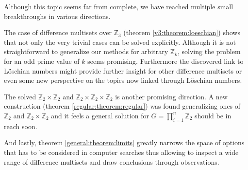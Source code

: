 Although this topic seems far from complete, we have reached multiple small breakthroughs in various directions.

The case of difference multisets over $\mathbb Z_3$ (theorem \ref{v3:theorem:loeschian}) shows that not only the very trivial cases can be solved explicitly. Although it is not straightforward to generalize our methods for arbitrary $\mathbb Z_k$, solving the problem for an odd prime value of $k$ seems promising. Furthermore the discovered link to Löschian numbers might provide further insight for other difference multisets or even some new perspective on the topics now linked through Löschian numbers.

The solved $\mathbb Z_2 \times \mathbb Z_2$ and $\mathbb Z_2 \times \mathbb Z_2 \times \mathbb Z_2$ is another promising direction. A new construction (theorem \ref{regular:theorem:regular}) was found generalizing ones of $\mathbb Z_2$ and $\mathbb Z_2 \times \mathbb Z_2$ and it feels a general solution for $G=\prod_{i=1}^{n} \mathbb Z_2$ should be in reach soon.

And lastly, theorem \ref{general:theorem:limits} greatly narrows the space of options that has to be considered in computer searches thus allowing to inspect a wide range of difference multisets and draw conclusions through observations.

